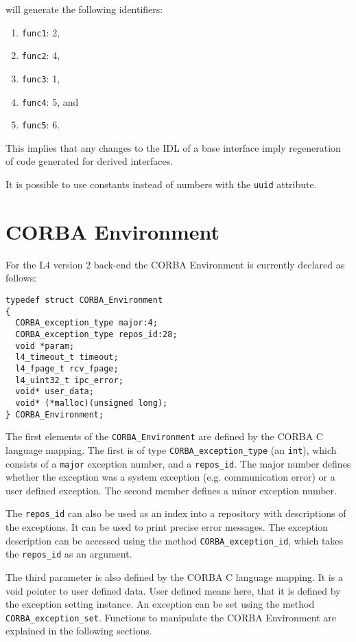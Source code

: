 will generate the following identifiers:

\begin{enumerate}
\item \verb|func1|: 2,
\item \verb|func2|: 4,
\item \verb|func3|: 1,
\item \verb|func4|: 5, and
\item \verb|func5|: 6.
\end{enumerate}

This implies that any changes to the IDL of a base interface 
imply regeneration of code generated for derived interfaces.

It is possible to use constants instead of numbers
with the \verb|uuid| attribute.

\section{CORBA Environment}
\label{sec:environment}

For the L4 version 2 back-end the CORBA Environment is currently
declared as follows:

\begin{verbatim}
typedef struct CORBA_Environment
{
  CORBA_exception_type major:4;
  CORBA_exception_type repos_id:28;
  void *param;
  l4_timeout_t timeout;
  l4_fpage_t rcv_fpage;
  l4_uint32_t ipc_error;
  void* user_data;
  void* (*malloc)(unsigned long);
} CORBA_Environment;
\end{verbatim}	    

The first elements of the \verb|CORBA_Environment| are defined
by the CORBA C language mapping. The first is of type 
\verb|CORBA_exception_type| (an \verb|int|), which consists of
a \verb|major| exception number, and a \verb|repos_id|. The major
number defines whether the exception was a system exception (e.g.
communication error) or a user defined exception. The second 
member defines a minor exception number. 

The \verb|repos_id| can also be used as an index into a
repository with descriptions of the exceptions. It can be
used to print precise error messages. The exception description
can be accessed using the method \verb|CORBA_exception_id|,
which takes the \verb|repos_id| as an argument.

The third parameter is also defined by the CORBA C language
mapping. It is a void pointer to user defined data. User defined
means here, that it is defined by the exception setting instance.
An exception can be set using the method \verb|CORBA_exception_set|.
Functions to manipulate the CORBA Environment are explained
in the following sections.

